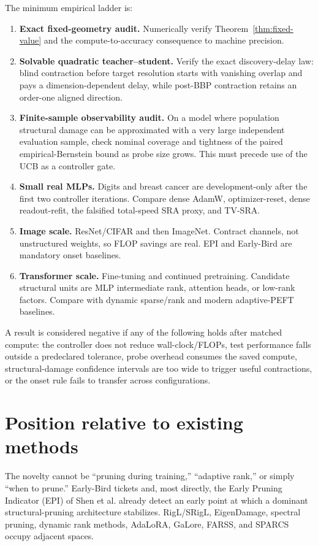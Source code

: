 The minimum empirical ladder is:
\begin{enumerate}
\item \textbf{Exact fixed-geometry audit.} Numerically verify Theorem~\ref{thm:fixed-value} and the compute-to-accuracy consequence to machine precision.
\item \textbf{Solvable quadratic teacher--student.} Verify the exact discovery-delay law: blind contraction before target resolution starts with vanishing overlap and pays a dimension-dependent delay, while post-BBP contraction retains an order-one aligned direction.
\item \textbf{Finite-sample observability audit.} On a model where population structural damage can be approximated with a very large independent evaluation sample, check nominal coverage and tightness of the paired empirical-Bernstein bound as probe size grows. This must precede use of the UCB as a controller gate.
\item \textbf{Small real MLPs.} Digits and breast cancer are development-only after the first two controller iterations. Compare dense AdamW, optimizer-reset, dense readout-refit, the falsified total-speed SRA proxy, and TV-SRA.
\item \textbf{Image scale.} ResNet/CIFAR and then ImageNet. Contract channels, not unstructured weights, so FLOP savings are real. EPI and Early-Bird are mandatory onset baselines.
\item \textbf{Transformer scale.} Fine-tuning and continued pretraining. Candidate structural units are MLP intermediate rank, attention heads, or low-rank factors. Compare with dynamic sparse/rank and modern adaptive-PEFT baselines.
\end{enumerate}

A result is considered negative if any of the following holds after matched compute: the controller does not reduce wall-clock/FLOPs, test performance falls outside a predeclared tolerance, probe overhead consumes the saved compute, structural-damage confidence intervals are too wide to trigger useful contractions, or the onset rule fails to transfer across configurations.

\section{Position relative to existing methods}
The novelty cannot be ``pruning during training,'' ``adaptive rank,'' or simply ``when to prune.'' Early-Bird tickets and, most directly, the Early Pruning Indicator (EPI) of Shen et al. already detect an early point at which a dominant structural-pruning architecture stabilizes. RigL/SRigL, EigenDamage, spectral pruning, dynamic rank methods, AdaLoRA, GaLore, FARSS, and SPARCS occupy adjacent spaces.

